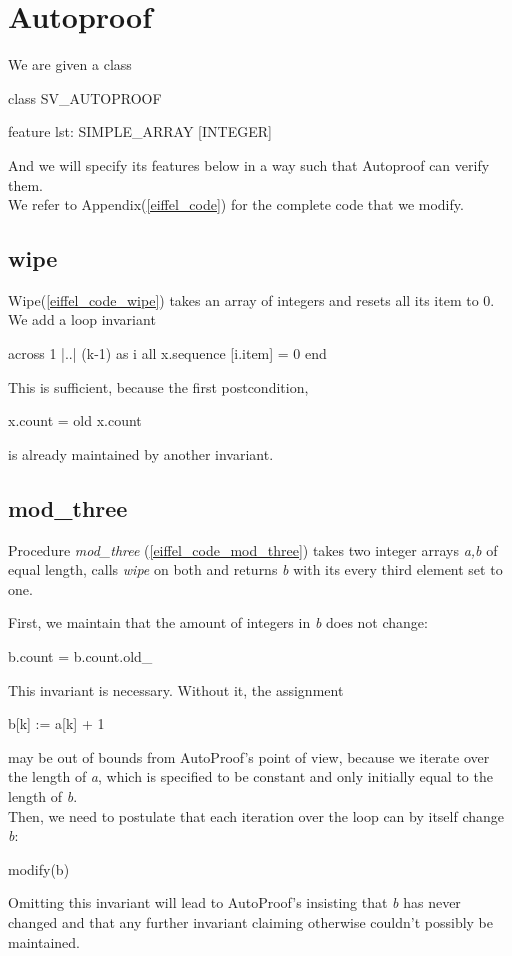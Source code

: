 \section{Autoproof}\label{eiffel_discussion}
We are given a class
\begin{eBox}
class
	SV_AUTOPROOF

feature 
	lst: SIMPLE_ARRAY [INTEGER]
\end{eBox}

And we will specify its features below in a way such that Autoproof can verify them.\\
We refer to Appendix(\ref{eiffel_code}) for the complete code that we modify.

\subsection{wipe}
Wipe(\ref{eiffel_code_wipe}) takes an array of integers and resets all its item to 0.
We add a loop invariant
\begin{eSimple}
across 1 |..| (k-1) as i all
	x.sequence [i.item] = 0 end
\end{eSimple}

This is sufficient, because the first postcondition,
\begin{eSimple}
x.count = old x.count
\end{eSimple}
is already maintained by another invariant.   

\subsection{mod\_three}
Procedure \emph{mod\_three} (\ref{eiffel_code_mod_three}) takes two integer arrays \emph{a,b} of equal length, 
calls \emph{wipe} on both and returns \emph{b} with its every third element set to one.

First, we maintain that the amount of integers in \emph{b} does not change:
\begin{eSimple}
b.count = b.count.old_
\end{eSimple}
This invariant is necessary. Without it, the assignment
\begin{eSimple}
b[k] := a[k] + 1
\end{eSimple}
may be out of bounds from AutoProof's point of view, because we iterate over the length of \emph{a}, which is specified to be constant and only initially equal to the length of \emph{b}.\\

Then, we need to postulate that each iteration over the loop can by itself change \emph{b}:
\begin{eSimple}
modify(b)
\end{eSimple}
Omitting this invariant will lead to AutoProof's insisting that \emph{b} has never changed and that any further invariant claiming otherwise couldn't possibly be maintained.\\


